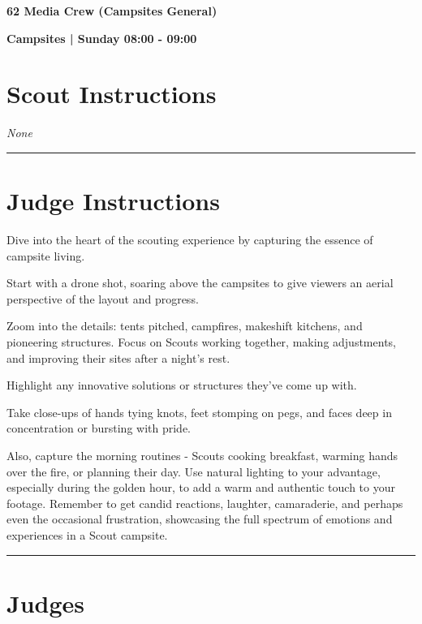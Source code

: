 \documentclass[10pt]{article}
\newcommand{\newtitle}[1]{\begin{center}{\Huge\bfseries #1 }\\ \vspace{5mm}\end{center}}
\newcommand{\newsubtitle}[1]{\begin{center}{\color{grey}\Large\bfseries #1 }\\ \vspace{5mm}\end{center}}
\begin{document}
	\vspace{1cm}


	\clearpage
		\newtitle{62 Media Crew (Campsites General) }
	\newsubtitle{Campsites | Sunday 08:00 - 09:00}
		\setcounter{section}{61}
	\section*{Scout Instructions}
		\textit{None}
	
	\vspace{0.5cm}
	\hrule
	\vspace{0.5cm}

		\section*{Judge Instructions}
		Dive into the heart of the scouting experience by capturing the essence of campsite living. 

Start with a drone shot, soaring above the campsites to give viewers an aerial perspective of the layout and progress. 

Zoom into the details: tents pitched, campfires, makeshift kitchens, and pioneering structures. Focus on Scouts working together, making adjustments, and improving their sites after a night's rest. 

Highlight any innovative solutions or structures they've come up with. 

Take close-ups of hands tying knots, feet stomping on pegs, and faces deep in concentration or bursting with pride. 

Also, capture the morning routines - Scouts cooking breakfast, warming hands over the fire, or planning their day. Use natural lighting to your advantage, especially during the golden hour, to add a warm and authentic touch to your footage. Remember to get candid reactions, laughter, camaraderie, and perhaps even the occasional frustration, showcasing the full spectrum of emotions and experiences in a Scout campsite.


\vspace{0.5cm}
	\hrule
	\vspace{0.5cm}
		\section*{\faUsers \: Judges}

		
\end{document}
